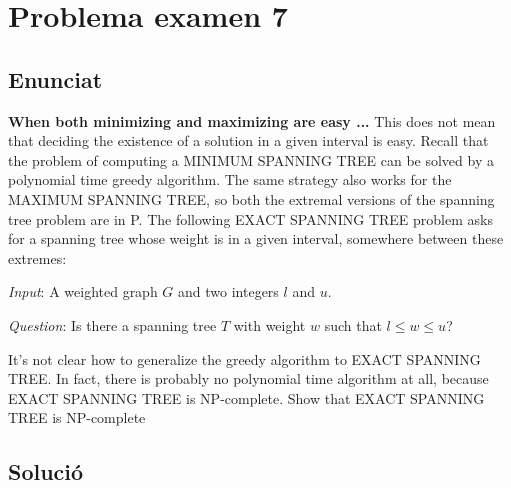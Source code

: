\section{Problema examen 7}
\subsection{Enunciat}
\textbf{When both minimizing and maximizing are easy ...} This does not mean that deciding the existence of a solution in a given interval is easy. Recall that the problem of computing a MINIMUM SPANNING TREE can be solved by a polynomial time greedy algorithm. The same strategy also works for the MAXIMUM SPANNING TREE, so both the extremal versions of the spanning tree problem are in P. The following EXACT SPANNING TREE problem asks for a spanning tree whose weight is in a given interval, somewhere between these extremes:

\textit{Input}: A weighted graph $G$ and two integers $l$ and $u$. 

\textit{Question}: Is there a spanning tree $T$ with weight $w$ such that $l \leq w \leq u$?

\vspace{5mm}
It’s not clear how to generalize the greedy algorithm to EXACT SPANNING TREE. In fact, there is probably no polynomial time algorithm at all, because EXACT SPANNING TREE is NP-complete. Show that EXACT SPANNING TREE is NP-complete

\subsection{Solució}